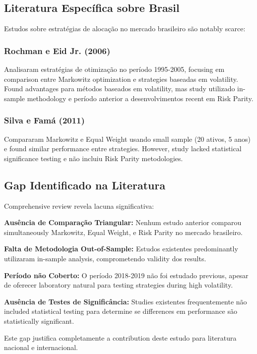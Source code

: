 \subsection{Literatura Específica sobre Brasil}

Estudos sobre estratégias de alocação no mercado brasileiro são notably scarce:

\subsubsection{Rochman e Eid Jr. (2006)}

Analisaram estratégias de otimização no período 1995-2005, focusing em comparison entre Markowitz optimization e strategies baseadas em volatility. Found advantages para métodos baseados em volatility, mas study utilizado in-sample methodology e período anterior a desenvolvimentos recent em Risk Parity.

\subsubsection{Silva e Famá (2011)}

Compararam Markowitz e Equal Weight usando small sample (20 ativos, 5 anos) e found similar performance entre strategies. However, study lacked statistical significance testing e não incluiu Risk Parity metodologies.

\subsection{Gap Identificado na Literatura}

Comprehensive review revela lacuna significativa:

\textbf{Ausência de Comparação Triangular:} Nenhum estudo anterior comparou simultaneously Markowitz, Equal Weight, e Risk Parity no mercado brasileiro.

\textbf{Falta de Metodologia Out-of-Sample:} Estudos existentes predominantly utilizaram in-sample analysis, comprometendo validity dos results.

\textbf{Período não Coberto:} O período 2018-2019 não foi estudado previous, apesar de oferecer laboratory natural para testing strategies during high volatility.

\textbf{Ausência de Testes de Significância:} Studies existentes frequentemente não included statistical testing para determine se differences em performance são statistically significant.

Este gap justifica completamente a contribution deste estudo para literatura nacional e internacional.